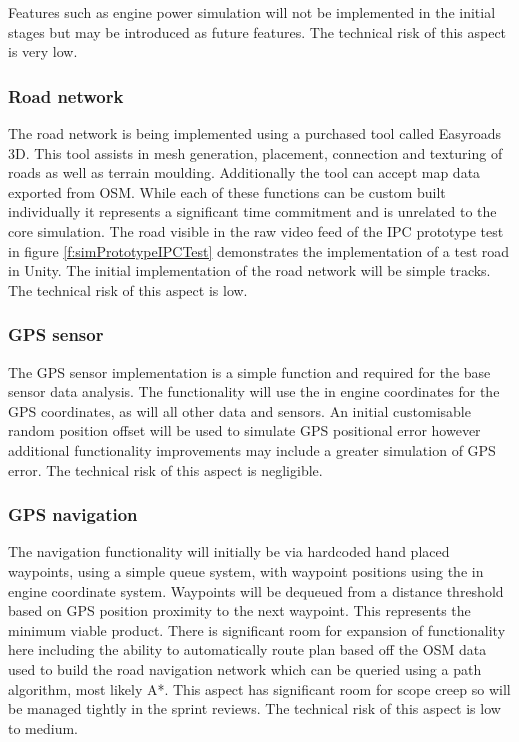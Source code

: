 \documentclass[]{aiaa-tc}%
\begin{document}
Features such as engine power simulation will not be implemented in the initial stages but may be introduced as future features. The technical risk of this aspect is very low.

\subsubsection{Road network}

The road network is being implemented using a purchased tool called Easyroads 3D. This tool assists in mesh generation, placement, connection and texturing of roads as well as terrain moulding. Additionally the tool can accept map data exported from OSM. While each of these functions can be custom built individually it represents a significant time commitment and is unrelated to the core simulation. The road visible in the raw video feed of the IPC prototype test in figure \ref{f:simPrototypeIPCTest} demonstrates the implementation of a test road in Unity. The initial implementation of the road network will be simple tracks. The technical risk of this aspect is low.

\subsubsection{GPS sensor}

The GPS sensor implementation is a simple function and required for the base sensor data analysis. The functionality will use the in engine coordinates for the GPS coordinates, as will all other data and sensors. An initial customisable random position offset will be used to simulate GPS positional error however additional functionality improvements may include a greater simulation of GPS error. The technical risk of this aspect is negligible.

\subsubsection{GPS navigation}

The navigation functionality will initially be via hardcoded hand placed waypoints, using a simple queue system, with waypoint positions using the in engine coordinate system. Waypoints will be dequeued from a distance threshold based on GPS position proximity to the next waypoint. This represents the minimum viable product. There is significant room for expansion of functionality here including the ability to automatically route plan based off the OSM data used to build the road navigation network which can be queried using a path algorithm, most likely A*. This aspect has significant room for scope creep so will be managed tightly in the sprint reviews. The technical risk of this aspect is low to medium.
\end{document}
